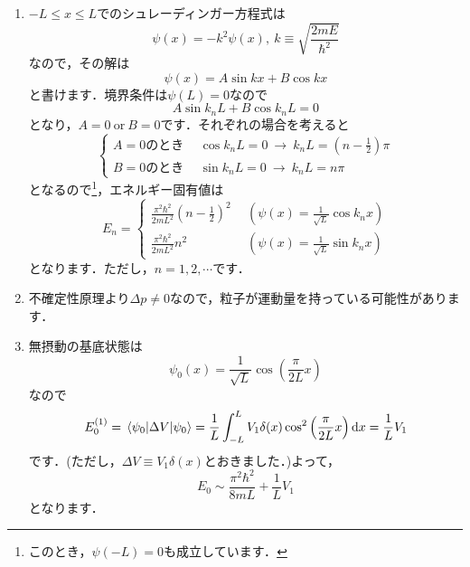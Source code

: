 \documentclass[a4paper,pdflatex,ja=standard]{bxjsarticle}
\begin{document}
\begin{enumerate}

  \item 

  $-L\leq x\leq L$でのシュレーディンガー方程式は
  \begin{equation}
    \psi(x)
    =
    -k^2\psi(x)
    ,\ 
    k\equiv \sqrt{\frac{2mE}{\hbar^2}}
  \end{equation}
  なので，その解は
  \begin{equation}
    \psi(x)
    =
    A\sin kx
    +
    B\cos kx
  \end{equation}
  と書けます．境界条件は$\psi(L)=0$なので
  \begin{equation}
    A\sin k_n L+B\cos k_n L
    =
    0
  \end{equation}
  となり，$A=0\ \mathrm{or}\ B=0$です．それぞれの場合を考えると
  \begin{equation}
    \left\{
      \begin{alignedat}{1}
        A=0\text{のとき}
        \ &\ 
        \cos k_nL=0\ \rightarrow\ 
        k_nL
        =
        \left( n-\frac{1}{2} \right)\pi
        \\
        B=0\text{のとき}
        \ &\ 
        \sin k_nL=0\ \rightarrow\ 
        k_nL
        =
        n\pi
      \end{alignedat}
    \right.
  \end{equation}
  となるので\footnote{
    このとき，$\psi(-L)=0$も成立しています．
  }，エネルギー固有値は
  \begin{equation}
    E_{n}
    =
    \left\{
      \begin{alignedat}{1}
        \frac{\pi^2\hbar^2}{2mL^2}\left( n-\frac{1}{2} \right)^2
        \ &\ 
        \left( \psi(x)=\frac{1}{\sqrt{L}}\cos k_n x \right)
        \\
        \frac{\pi^2\hbar^2}{2mL^2}n^2
        \ &\ 
        \left( \psi(x)=\frac{1}{\sqrt{L}}\sin k_n x \right)
      \end{alignedat}
    \right.
  \end{equation}
  となります．ただし，$n=1,2,\cdots$です．


  \item 

  不確定性原理より$\Delta p\neq0$なので，粒子が運動量を持っている可能性があります．


  \item 

  無摂動の基底状態は
  \begin{equation}
    \psi_0(x)
    =
    \frac{1}{\sqrt{L}}\cos\left( \frac{\pi}{2L}x \right)
  \end{equation}
  なので
  \begin{equation}
    E_0^{(1)}
    =
    \mel*{\psi_0}{\Delta V}{\psi_0}
    =
    \frac{1}{L}
    \int_{-L}^{L}
    V_1\delta(x)\cos^2\left( \frac{\pi}{2L}x \right)
    \dd x
    =
    \frac{1}{L}V_1
  \end{equation}
  です．(ただし，$\Delta V\equiv V_1\delta(x)$とおきました．)よって，
  \begin{equation}
    E_0
    \sim
    \frac{\pi^2\hbar^2}{8mL}
    +
    \frac{1}{L}V_1
    \label{ans_2_1_3}
  \end{equation}
  となります．



\end{enumerate}
\end{document}
